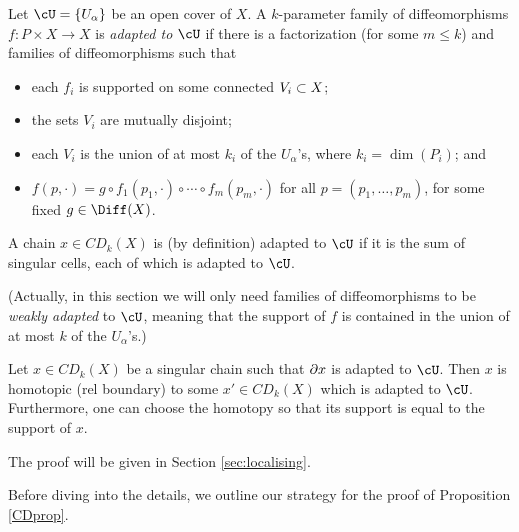Let $\cU = \{U_\alpha\}$ be an open cover of $X$.
A $k$-parameter family of diffeomorphisms $f: P \times X \to X$ is
{\it adapted to $\cU$} if there is a factorization
(for some $m \le k$)
and families of diffeomorphisms
such that
\begin{itemize}
\item each $f_i$ is supported on some connected $V_i \subset X$;
\item the sets $V_i$ are mutually disjoint;
\item each $V_i$ is the union of at most $k_i$ of the $U_\alpha$'s,
where $k_i = \dim(P_i)$; and
\item $f(p, \cdot) = g \circ f_1(p_1, \cdot) \circ \cdots \circ f_m(p_m, \cdot)$
for all $p = (p_1, \ldots, p_m)$, for some fixed $g \in \Diff(X)$.
\end{itemize}
A chain $x \in CD_k(X)$ is (by definition) adapted to $\cU$ if it is the sum
of singular cells, each of which is adapted to $\cU$.

(Actually, in this section we will only need families of diffeomorphisms to be 
{\it weakly adapted} to $\cU$, meaning that the support of $f$ is contained in the union
of at most $k$ of the $U_\alpha$'s.)

\begin{lemma}  \label{extension_lemma}
Let $x \in CD_k(X)$ be a singular chain such that $\partial x$ is adapted to $\cU$.
Then $x$ is homotopic (rel boundary) to some $x' \in CD_k(X)$ which is adapted to $\cU$.
Furthermore, one can choose the homotopy so that its support is equal to the support of $x$.
\end{lemma}

The proof will be given in Section \ref{sec:localising}.

\medskip

Before diving into the details, we outline our strategy for the proof of Proposition \ref{CDprop}.

